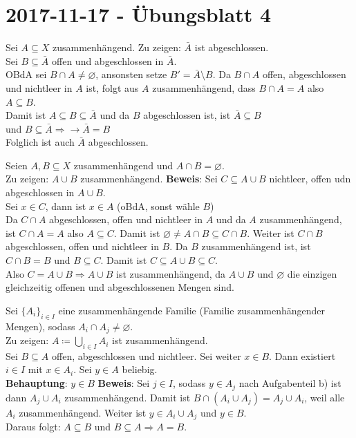 \section{2017-11-17 - Übungsblatt 4}

\begin{problem*}[1]
Sei $A \subseteq X$ zusammenhängend. Zu zeigen: $\bar{A}$ ist abgeschlossen.\\ 
Sei $B \subseteq \bar{A}$ offen und abgeschlossen in $\bar{A}$.\\
OBdA sei $B \cap A \neq \varnothing$, ansonsten setze $B' = \bar{A}\setminus B$.
Da $B \cap A$ offen, abgeschlossen und nichtleer in $A$ ist, folgt aus $A$ zusammenhängend, dass 
$B \cap A = A$ also $A \subseteq B$.\\
Damit ist $A \subseteq B \subseteq \bar{A} $ und da $ B $ abgeschlossen ist, ist $ \bar{A} \subseteq B $\\
und $B \subseteq \bar{A} \Rightarrow \rightarrow \bar{A} = B$\\
Folglich ist auch $ \bar{A} $ abgeschlossen.
\end{problem*}

\begin{problem*}[1b]
Seien $ A,B \subseteq X$ zusammenhängend und $ A \cap B = \varnothing $.\\
Zu zeigen: $ A \cup B$ zusammenhängend.
\textbf{Beweis}: Sei $C \subseteq A \cup B$ nichtleer, offen udn abgeschlossen in $ A \cup B$.\\
Sei $x \in C$, dann ist $ x \in A$ (oBdA, sonst wähle $ B $)\\
Da $C \cap A$ abgeschlossen, offen und nichtleer in $ A $ und da $ A $ zusammenhängend, ist $ C \cap A = A$
also $A \subseteq C$. Damit ist $\varnothing \neq A \cap B \subseteq C \cap B$. Weiter ist $C \cap B$ abgeschlossen, offen und nichtleer in $ B $. Da $ B $ zusammenhängend ist, ist $ C \cap B = B$ und $B \subseteq C$. Damit ist $C \subseteq A \cup B \subseteq C$.\\
Also $C = A \cup B \Rightarrow A \cup B$ ist zusammenhängend, da $ A \cup B $ und $\varnothing$ die einzigen gleichzeitig offenen und abgeschlossenen Mengen sind.  

\end{problem*}

\begin{problem*}[1c]
Sei $ \{ A_i \}_{i \in I}$ eine zusammenhängende Familie (Familie zusammenhängender Mengen), sodass 
$ A_i \cap A_j \neq \varnothing$.\\ 
Zu zeigen: $A \coloneqq \bigcup_{ i \in I } A_i$ ist zusammenhängend.\\
Sei $B \subseteq A$ offen, abgeschlossen und nichtleer. Sei weiter $x \in B$. Dann existiert $i \in I$ mit
$x \in A_i$. Sei $y \in A$ beliebig.\\
\textbf{Behauptung}: $y \in B$
\textbf{Beweis}: Sei $ j \in I$, sodass $ y \in A_j$ nach Aufgabenteil b) ist dann $ A_j \cup A_i $ zusammenhängend. Damit ist $ B \cap (A_i \cup A_j) = A_j \cup A_i $, weil alle $ A_i $ zusammenhängend.
Weiter ist $y \in A_i \cup A_j$ und $ y \in B $.\\
Daraus folgt: $A \subseteq B $ und $ B \subseteq A \Rightarrow A = B$.
\end{problem*}

